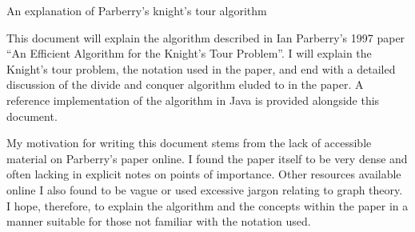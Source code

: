 \documentclass[11pt, a4paper]{article}
\begin{document}
{\centering\Large{An explanation of Parberry's knight's tour algorithm}}

This document will explain the algorithm described in Ian Parberry's 1997 paper ``An Efficient Algorithm for the Knight's Tour Problem''. I will explain the Knight's tour problem, the notation used in the paper, and end with a detailed discussion of the divide and conquer algorithm eluded to in the paper. A reference implementation of the algorithm in Java is provided alongside this document.

My motivation for writing this document stems from the lack of accessible material on Parberry's paper online. I found the paper itself to be very dense and often lacking in explicit notes on points of importance. Other resources available online I also found to be vague or used excessive jargon relating to graph theory. I hope, therefore, to explain the algorithm and the concepts within the paper in a manner suitable for those not familiar with the notation used.
\end{document}
